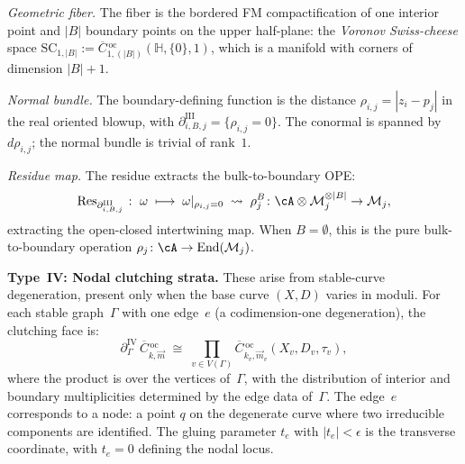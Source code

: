 \begin{proposition}
\emph{Geometric fiber.}
The fiber is the bordered FM compactification of one interior
point and $|B|$ boundary points on the upper half-plane: the
\emph{Voronov Swiss-cheese} space
$\mathrm{SC}_{1, |B|} :=
\overline{C}{}^{\,\mathrm{oc}}_{1, (|B|)}(\mathbb{H}, \{0\}, 1)$,
which is a manifold with corners of dimension $|B| + 1$.

\emph{Normal bundle.}
The boundary-defining function is the distance
$\rho_{i,j} = |z_i - p_j|$ in the real oriented blowup, with
$\partial_{i,B,j}^{\mathrm{III}} = \{\rho_{i,j} = 0\}$. The
conormal is spanned by $d\rho_{i,j}$; the normal bundle is
trivial of rank~$1$.

\emph{Residue map.}
The residue extracts the bulk-to-boundary OPE:
\begin{equation}\label{eq:typeIII-residue}
\operatorname{Res}_{\partial_{i,B,j}^{\mathrm{III}}}
\;\colon\;
\omega \;\longmapsto\;
\omega|_{\rho_{i,j} = 0}
\;\leadsto\;
\rho_j^B
\colon \cA \otimes \mathcal{M}_j^{\otimes |B|} \to
\mathcal{M}_j,
\end{equation}
extracting the open-closed intertwining map. When $B =
\emptyset$, this is the pure bulk-to-boundary operation
$\rho_j \colon \cA \to \operatorname{End}(\mathcal{M}_j)$.

\medskip
\noindent\textbf{Type~IV: Nodal clutching strata.}
These arise from stable-curve degeneration, present only when
the base curve $(X, D)$ varies in moduli. For each stable
graph~$\Gamma$ with one edge~$e$ (a codimension-one
degeneration), the clutching face is:
\begin{equation}\label{eq:typeIV-stratum}
\partial_\Gamma^{\mathrm{IV}}\,
\overline{C}{}^{\,\mathrm{oc}}_{k,\vec{m}}
\;\cong\;
\prod_{v \in V(\Gamma)}
\overline{C}{}^{\,\mathrm{oc}}_{k_v,\vec{m}_v}
(X_v, D_v, \tau_v),
\end{equation}
where the product is over the vertices of~$\Gamma$, with the
distribution of interior and boundary multiplicities determined
by the edge data of~$\Gamma$. The edge~$e$ corresponds to a
node: a point $q$ on the degenerate curve where two irreducible
components are identified. The gluing parameter
$t_e$ with $|t_e| < \epsilon$ is the transverse coordinate,
with $t_e = 0$ defining the nodal locus.


\end{proposition}
